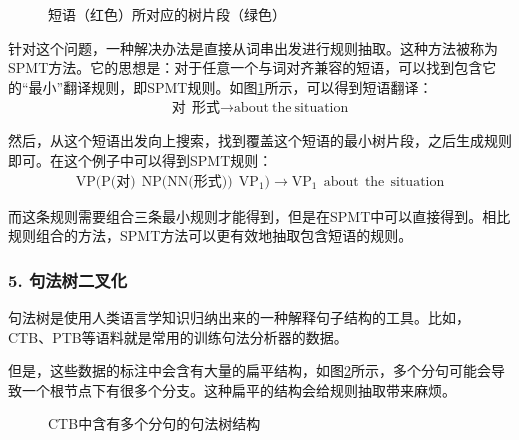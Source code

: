 \begin{figure}[htp]
\centering

\caption{短语（红色）所对应的树片段（绿色）}
\label{fig:8-30}
\end{figure}

\parinterval 针对这个问题，一种解决办法是直接从词串出发进行规则抽取。这种方法被称为SPMT方法。它的思想是：对于任意一个与词对齐兼容的短语，可以找到包含它的“最小”翻译规则，即SPMT规则。如图\ref{fig:8-30}所示，可以得到短语翻译：
\begin{eqnarray}
\textrm{对}\ \ \textrm{形式} \rightarrow \textrm{about}\ \textrm{the}\ \textrm{situation} \nonumber
\end{eqnarray}

\parinterval 然后，从这个短语出发向上搜索，找到覆盖这个短语的最小树片段，之后生成规则即可。在这个例子中可以得到SPMT规则：
\begin{eqnarray}
\textrm{VP(P(对)}\ \ \textrm{NP(NN(形式))}\ \ \textrm{VP}_1) \rightarrow \textrm{VP}_1\ \ \textrm{about}\ \ \textrm{the}\ \ \textrm{situation} \nonumber
\end{eqnarray}

\parinterval 而这条规则需要组合三条最小规则才能得到，但是在SPMT中可以直接得到。相比规则组合的方法，SPMT方法可以更有效地抽取包含短语的规则。


\subsubsection{5. 句法树二叉化}

\parinterval 句法树是使用人类语言学知识归纳出来的一种解释句子结构的工具。比如， CTB、PTB等语料就是常用的训练句法分析器的数据。


\parinterval 但是，这些数据的标注中会含有大量的扁平结构，如图\ref{fig:8-31}所示，多个分句可能会导致一个根节点下有很多个分支。这种扁平的结构会给规则抽取带来麻烦。

\begin{figure}[htp]
\centering

\caption{CTB中含有多个分句的句法树结构}
\label{fig:8-31}
\end{figure}

